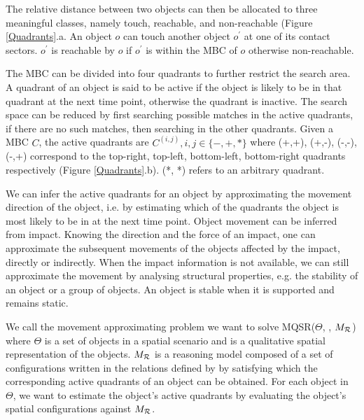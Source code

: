 \documentclass[letterpaper]{article}
\begin{document}
The relative distance between two objects can then be allocated to three meaningful classes, namely touch, reachable, and non-reachable (Figure \ref{Quadrants}.a. An object $o$ can touch another object $o^\prime$ at one of its contact sectors. $o^\prime$ is reachable by $o$ if $o^\prime$ is within the MBC of $o$ otherwise non-reachable. 

The MBC can be divided into four quadrants to further restrict the search area. A quadrant of an object is said to be active if the object is likely to be in that quadrant at the next time point, otherwise the quadrant is inactive. The search space can be reduced by first searching possible matches in the active quadrants, if there are no such matches, then searching in the other quadrants. Given a MBC $C$, the active quadrants are $C^{(i,j)}, i,j \in \{-, +, *\}$ where (+,+), (+,-), (-,-), (-,+) correspond to the top-right, top-left, bottom-left, bottom-right quadrants respectively (Figure \ref{Quadrants}.b). (*, *) refers to an arbitrary quadrant. 

We can infer the active quadrants for an object by approximating the movement direction of the object, i.e. by estimating which of the quadrants the object is most likely to be in at the next time point. Object movement can be inferred from impact. Knowing the direction and the force of an impact, one can approximate the subsequent movements of the objects affected by the impact, directly or indirectly. When the impact information is not available, we can still approximate the movement by analysing structural properties, e.g. the stability of an object or a group of objects. An object is stable when it is supported and remains static. %

We call the movement approximating problem we want to solve MQSR($\Theta$, , $M_{\cal{R}}$) where $\Theta$ is a set of objects in a spatial scenario and  is a qualitative spatial representation of the objects. $M_{\cal{R}}$ is a reasoning model composed of a set of configurations written in the relations defined by  by satisfying which the corresponding active quadrants of an object can be obtained. For each object in $\Theta$, we want to estimate the object's active quadrants by evaluating the object's spatial configurations against $M_{\cal{R}}$.
\end{document}
